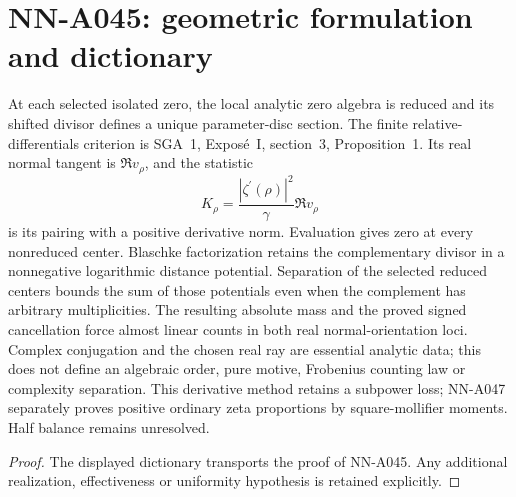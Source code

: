 \section{NN-A045: geometric formulation and dictionary}
\begin{geometricstatement}[NN-A045]
At each selected isolated zero, the local analytic zero algebra is reduced and its shifted divisor defines a unique parameter-disc section. The finite relative-differentials criterion is SGA~1, Expos\'e~I, section~3, Proposition~1. Its real normal tangent is $\Re v_\rho$, and the statistic \[K_\rho=\frac{|\zeta^\prime(\rho)|^2}{\gamma}\Re v_\rho\] is its pairing with a positive derivative norm. Evaluation gives zero at every nonreduced center. Blaschke factorization retains the complementary divisor in a nonnegative logarithmic distance potential. Separation of the selected reduced centers bounds the sum of those potentials even when the complement has arbitrary multiplicities. The resulting absolute mass and the proved signed cancellation force almost linear counts in both real normal-orientation loci. Complex conjugation and the chosen real ray are essential analytic data; this does not define an algebraic order, pure motive, Frobenius counting law or complexity separation. This derivative method retains a subpower loss; NN-A047 separately proves positive ordinary zeta proportions by square-mollifier moments. Half balance remains unresolved.
\end{geometricstatement}
\begin{proof} The displayed dictionary transports the proof of NN-A045. Any additional realization, effectiveness or uniformity hypothesis is retained explicitly.\end{proof}


